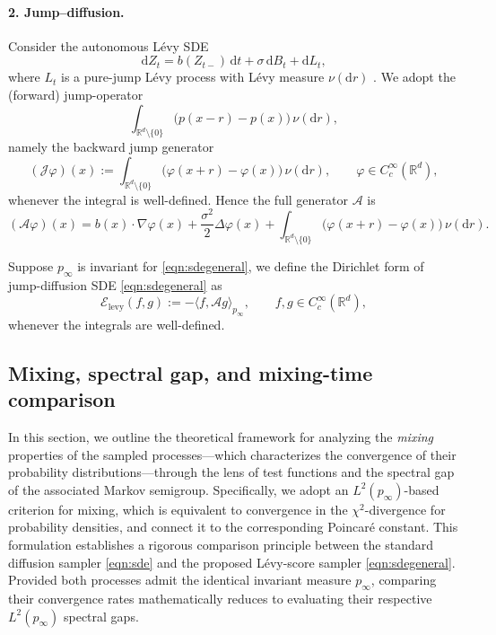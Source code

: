 \paragraph{2. Jump--diffusion.}
Consider the autonomous L\'evy SDE 
\begin{equation}\label{eqn:sdegeneral}
\mathrm{d}Z_t=b(Z_{t-})\,\mathrm{d}t+\sigma\,\mathrm{d}B_t+\mathrm{d}L_t,
\end{equation}
where $L_t$ is a pure-jump L\'evy process with L\'evy measure $\nu(\mathrm{d}r)$ \cite{applebaum2009levy}.
We adopt the (forward) jump-operator
\[
\int_{\mathbb{R}^d\setminus\{0\}}\big(p(x-r)-p(x)\big)\,\nu(\mathrm{d}r),
\]
namely the backward jump generator
\[
(\mathcal{J}\varphi)(x):=\int_{\mathbb{R}^d\setminus\{0\}}\big(\varphi(x+r)-\varphi(x)\big)\,\nu(\mathrm{d}r),
\qquad \varphi\in C_c^\infty(\mathbb{R}^d),
\]
whenever the integral is well-defined. Hence the full generator $\mathcal{A}$ is
\begin{equation}\label{eq:generator_levy}
(\mathcal{A}\varphi)(x)
=b(x)\cdot\nabla\varphi(x)+\frac{\sigma^2}{2}\Delta\varphi(x)
+\int_{\mathbb{R}^d\setminus\{0\}}\big(\varphi(x+r)-\varphi(x)\big)\,\nu(\mathrm{d}r).
\end{equation}

\begin{definition}
Suppose $p_\infty$ is invariant for \eqref{eqn:sdegeneral}, we define the Dirichlet form of jump-diffusion SDE \eqref{eqn:sdegeneral} as
\[
\mathcal{E}_{\mathrm{levy}}(f,g):=-\langle f,\mathcal{A}g\rangle_{p_\infty},
\qquad f,g\in C_c^\infty(\mathbb{R}^d),
\]
whenever the integrals are well-defined.
\end{definition}\label{def:dirichletlevy}


\subsection{Mixing, spectral gap, and mixing-time comparison}\label{subsubsec:L2_gap_mixing}

In this section, we outline the theoretical framework for analyzing the \emph{mixing} properties of the sampled processes---which characterizes the convergence of their probability distributions---through the lens of test functions and the spectral gap of the associated Markov semigroup. Specifically, we adopt an $L^2(p_\infty)$-based criterion for mixing, which is equivalent to convergence in the $\chi^2$-divergence for probability densities, and connect it to the corresponding Poincar\'e constant. This formulation establishes a rigorous comparison principle between the standard diffusion sampler \eqref{eqn:sde} and the proposed L\'evy-score sampler \eqref{eqn:sdegeneral}. Provided both processes admit the identical invariant measure $p_\infty$, comparing their convergence rates mathematically reduces to evaluating their respective $L^2(p_\infty)$ spectral gaps.

